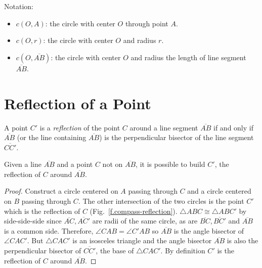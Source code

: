 \newpage

\noindent{}Notation:
\begin{itemize}
\item $c(O,A)$: the circle with center $O$ through point $A$.
\item $c(O,r)$: the circle with center $O$ and radius $r$.
\item $c(O,\overline{AB})$: the circle with center $O$ and radius the length of line segment $\overline{AB}$.
\end{itemize}


\section{Reflection of a Point}\label{s.reflection}

\begin{definition}
A point $C'$ is a \emph{reflection} of the point $C$ around a line segment $\overline{AB}$ if and only if $\overline{AB}$ (or the line containing $\overline{AB}$) is the perpendicular bisector of the line segment $\overline{CC'}$.
\end{definition}

\begin{theorem}\label{thm.compass-reflection}
Given a line $\overline{AB}$ and a point $C$ not on $\overline{AB}$, it is possible to build $C'$, the reflection of $C$ around $\overline{AB}$.
\end{theorem}

\begin{proof} 
Construct a circle centered on $A$ passing through $C$ and a circle centered on $B$ passing through $C$. The other intersection of the two circles is the point $C'$ which is the reflection of $C$ (Fig.~\ref{f.compass-reflection}).
$\triangle ABC \cong \triangle ABC'$ by side-side-side since $\overline{AC}, \overline{AC'}$ are radii of the same circle, as are $\overline{BC}, \overline{BC'}$ and $\overline{AB}$ is a common side. Therefore, $\angle CAB = \angle C'AB$ so $\overline{AB}$ is the angle bisector of $\angle CAC'$. But $\triangle CAC'$ is an isosceles triangle and the angle bisector $\overline{AB}$ is also the perpendicular bisector of $\overline{CC'}$, the base of $\triangle CAC'$. By definition $C'$ is the reflection of $C$ around $\overline{AB}$.
\end{proof}

